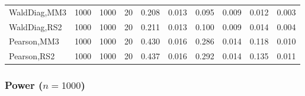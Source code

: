 \documentclass[
]{article}
\begin{document}
\begin{table}[H]
{\begin{tabular}[t]{lrrrrrrlrr}
\hspace{1em}WaldDiag,MM3 & 1000 & 1000 & 20 & 0.208 & 0.013 & 0.095 & 0.009 & 0.012 & 0.003\\
\hspace{1em}WaldDiag,RS2 & 1000 & 1000 & 20 & 0.211 & 0.013 & 0.100 & 0.009 & 0.014 & 0.004\\
\hspace{1em}Pearson,MM3 & 1000 & 1000 & 20 & 0.430 & 0.016 & 0.286 & 0.014 & 0.118 & 0.010\\
\hspace{1em}Pearson,RS2 & 1000 & 1000 & 20 & 0.437 & 0.016 & 0.292 & 0.014 & 0.135 & 0.011\\
\bottomrule
\end{tabular}}
\endgroup{}
\end{table}

\hypertarget{power-n1000-1}{%
\subsubsection{\texorpdfstring{Power
(\(n=1000\))}{Power (n=1000)}}\label{power-n1000-1}}
\end{document}
